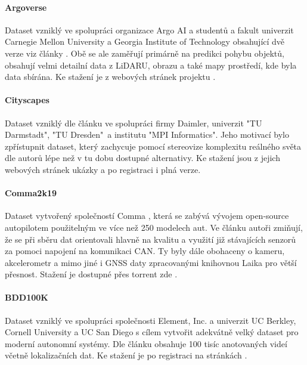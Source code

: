 \documentclass[czech, bc, kky, he, iso690numb]{fasthesis}
\begin{document}
    		\paragraph{Argoverse}
    			Dataset vzniklý ve spolupráci organizace Argo AI a studentů a fakult univerzit Carnegie Mellon University a Georgia Institute of Technology  obsahující dvě verze viz články \cite{dataset_Argoverse1_paper, dataset_Argoverse2_paper}. Obě se ale zaměřují primárně na predikci pohybu objektů, obsahují velmi detailní data z LiDARU, obrazu a také mapy prostředí, kde byla data sbírána. Ke stažení je z webových stránek projektu \cite{dataset_Argoverse}.
    			
   			\paragraph{Cityscapes}
   				Dataset vzniklý dle článku \cite{dataset_cityscapes_paper} ve spolupráci firmy Daimler, univerzit "TU Darmstadt", "TU Dresden"\ a institutu "MPI Informatics". Jeho motivací bylo zpřístupnit dataset, který zachycuje pomocí stereovize komplexitu reálného světa dle autorů lépe než v tu dobu dostupné alternativy. Ke stažení jsou z jejich webových stránek \cite{dataset_cityscapes} ukázky a po registraci i plná verze.
   				
  			\paragraph{Comma2k19}
  				Dataset vytvořený společností Comma \cite{Comma}, která se zabývá vývojem open-source autopilotem použitelným ve více než 250 modelech aut. Ve článku \cite{dataset_comma2k19_paper} autoři zmiňují, že se při sběru dat orientovali hlavně na kvalitu a využití již stávajících senzorů za pomoci napojení na komunikaci CAN. Ty byly dále obohaceny o kameru, akcelerometr a mimo jiné i GNSS daty zpracovanými knihovnou Laika \cite{Laika} pro větší přesnost. Stažení je dostupné přes torrent zde \cite{dataset_comma2k19_github, dataset_comma2k19_download}.
  				
  			\paragraph{BDD100K}
  				Dataset vzniklý ve spolupráci společnosti Element, Inc. a univerzit UC Berkley, Cornell University a UC San Diego s cílem vytvořit adekvátně velký dataset pro moderní autonomní systémy. Dle článku \cite{dataset_bdd100k_paper} obsahuje 100 tisíc anotovaných videí včetně lokalizačních dat. Ke stažení je po registraci na stránkách \cite{dataset_bdd100k}.
  				
\end{document}
